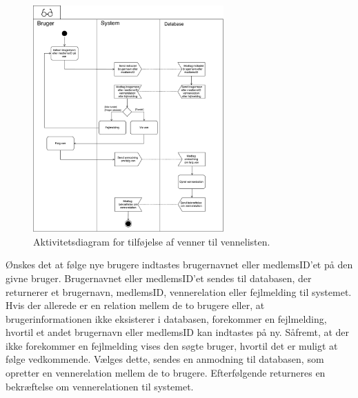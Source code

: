 \begin{figure} [H]
\centering
\includegraphics[width=0.65\textwidth]{figures/aktivitetsdiagram/foelgnyven}
\caption{Aktivitetsdiagram for tilføjelse af venner til vennelisten.}
\label{fig:tilfoejven}
\end{figure}

\noindent
Ønskes det at følge nye brugere indtastes brugernavnet eller medlemsID'et på den givne bruger. Brugernavnet eller medlemsID'et sendes til databasen, der returnerer et brugernavn, medlemsID, vennerelation eller fejlmelding til systemet. Hvis der allerede er en relation mellem de to brugere eller, at brugerinformationen ikke eksisterer i databasen, forekommer en fejlmelding, hvortil et andet brugernavn eller medlemsID kan indtastes på ny. 
Såfremt, at der ikke forekommer en fejlmelding vises den søgte bruger, hvortil det er muligt at følge vedkommende. 
Vælges dette, sendes en anmodning til databasen, som opretter en vennerelation mellem de to brugere. Efterfølgende returneres en bekræftelse om vennerelationen til systemet.